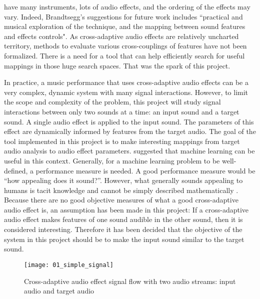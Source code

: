 have many instruments, lots of audio effects, and the ordering of the effects may vary. Indeed, Brandtsegg's suggestions for future work includes ``practical and musical exploration of the technique, and the mapping between sound features and effects controls". As cross-adaptive audio effects are relatively uncharted territory, methods to evaluate various cross-couplings of features have not been formalized. There is a need for a tool that can help efficiently search for useful mappings in those huge search spaces. That was the spark of this project.

In practice, a music performance that uses cross-adaptive audio effects can be a very complex, dynamic system with many signal interactions. However, to limit the scope and complexity of the problem, this project will study signal interactions between only two sounds at a time: an input sound and a target sound. A single audio effect is applied to the input sound. The parameters of this effect are dynamically informed by features from the target audio. The goal of the tool implemented in this project is to make interesting mappings from target audio analysis to audio effect parameters. \cite{brandtsegg2015} suggested that machine learning can be useful in this context. Generally, for a machine learning problem to be well-defined, a performance measure is needed. A good performance measure would be “how appealing does it sound?”. However, what generally sounds appealing to humans is tacit knowledge and cannot be simply described mathematically \citep{schmidhuber2009}. Because there are no good objective measures of what a good cross-adaptive audio effect is, an assumption has been made in this project: If a cross-adaptive audio effect makes features of one sound audible in the other sound, then it is considered interesting. Therefore it has been decided that the objective of the system in this project should be to make the input sound similar to the target sound.

\begin{figure}[h]
    \centering
    \texttt{[image: 01\_simple\_signal]}
    \caption{Cross-adaptive audio effect signal flow with two audio streams: input audio and target audio}
    \label{fig:simple_signal}
\end{figure}

